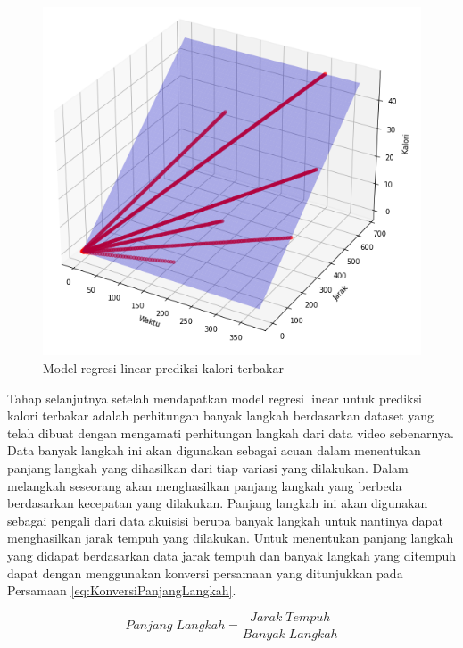 \begin{figure}[H]
  \centering
  \includegraphics[scale=0.7]{gambar/model regresi kalori3.png}
  \caption{Model regresi linear prediksi kalori terbakar}
  \label{fig:ModelRegresiKalori}
\end{figure}

Tahap selanjutnya setelah mendapatkan model regresi linear untuk prediksi kalori terbakar adalah perhitungan banyak langkah berdasarkan dataset yang telah dibuat dengan mengamati perhitungan langkah dari data video sebenarnya. Data banyak langkah ini akan digunakan sebagai acuan dalam menentukan panjang langkah yang dihasilkan dari tiap variasi yang dilakukan. Dalam melangkah seseorang akan menghasilkan panjang langkah yang berbeda berdasarkan kecepatan yang dilakukan. Panjang langkah ini akan digunakan sebagai pengali dari data akuisisi berupa banyak langkah untuk nantinya dapat menghasilkan jarak tempuh yang dilakukan. Untuk menentukan panjang langkah yang didapat berdasarkan data jarak tempuh dan banyak langkah yang ditempuh dapat dengan menggunakan konversi persamaan yang ditunjukkan pada Persamaan \ref{eq:KonversiPanjangLangkah}.

\begin{equation}
  \label{eq:KonversiPanjangLangkah}
  Panjang \; Langkah = \frac{Jarak \; Tempuh}{Banyak \; Langkah}
\end{equation}

